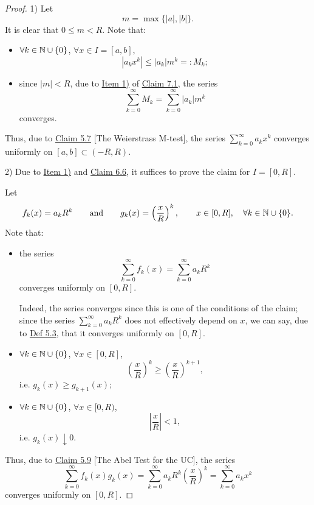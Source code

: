 \begin{proof}
1) Let
\[
m=\max\{|a|,|b|\}.
\]
It is clear that $0\leq m<R$.
Note that:
\begin{itemize}
    \item $\forall k\in\mathbb{N}\cup\{0\}$, $\forall x\in I=[a,b]$,
    \[
    |a_kx^k|\leq |a_k|m^k=:M_k;
    \]

    \item since $|m|<R$, due to \hyperref[item:claim:7.1:1]{Item 1)} of \hyperref[claim:7.1]{Claim 7.1}, the series
    \[
    \sum_{k=0}^{\infty}M_k
    =
    \sum_{k=0}^{\infty}|a_k|m^k
    \]
    converges.
\end{itemize}
Thus, due to \hyperref[claim:5.7]{Claim 5.7} [The Weierstrass M-test], the series $\sum_{k=0}^{\infty}a_kx^k$ converges uniformly on $[a,b]\subset(-R,R)$.

2) Due to \hyperref[item:claim:7.3:1]{Item 1)} and \hyperref[claim:6.6]{Claim 6.6}, it suffices to prove the claim for $I=[0,R]$.

Let
\[
f_k(x)=a_kR^k
\qquad\text{and}\qquad
g_k(x)=\left(\frac{x}{R}\right)^k,
\qquad x\in[0,R],\quad \forall k\in\mathbb{N}\cup\{0\}.
\]
Note that:
\begin{itemize}
    \item the series
    \[
    \sum_{k=0}^{\infty}f_k(x)
    =
    \sum_{k=0}^{\infty}a_kR^k
    \]
    converges uniformly on $[0,R]$.

    Indeed, the series converges since this is one of the conditions of the claim; since the series $\sum_{k=0}^{\infty}a_kR^k$ does not effectively depend on $x$, we can say, due to \hyperref[def:5.3]{Def 5.3}, that it converges uniformly on $[0,R]$.

    \item $\forall k\in\mathbb{N}\cup\{0\}$, $\forall x\in[0,R]$,
    \[
    \left(\frac{x}{R}\right)^k\geq\left(\frac{x}{R}\right)^{k+1},
    \]
    i.e. $g_k(x)\geq g_{k+1}(x)$;

    \item $\forall k\in\mathbb{N}\cup\{0\}$, $\forall x\in[0,R)$,
    \[
    \left|\frac{x}{R}\right|<1,
    \]
    i.e. $g_k(x)\downarrow0$.
\end{itemize}
Thus, due to \hyperref[claim:5.9]{Claim 5.9} [The Abel Test for the UC], the series
\[
\sum_{k=0}^{\infty}f_k(x)g_k(x)
=
\sum_{k=0}^{\infty}a_kR^k\left(\frac{x}{R}\right)^k
=
\sum_{k=0}^{\infty}a_kx^k
\]
converges uniformly on $[0,R]$.


\end{proof}

